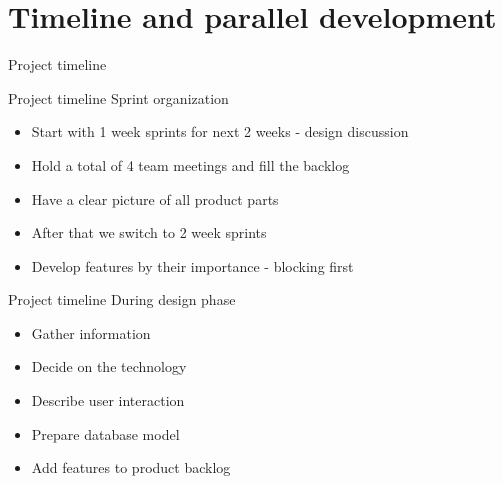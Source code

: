 \documentclass{beamer}
\begin{document}
	\section{Timeline and parallel development}
	
	\begin{frame}{Project timeline}
		\begin{figure}
		\end{figure}
	\end{frame}

	\begin{frame}{Project timeline}
		Sprint organization
		\begin{itemize}
			\item Start with 1 week sprints for next 2 weeks - design discussion
			\item Hold a total of 4 team meetings and fill the backlog
			\item Have a clear picture of all product parts
			\item After that we switch to 2 week sprints
			\item Develop features by their importance - blocking first
		\end{itemize}
	\end{frame}

	\begin{frame}{Project timeline}
		During design phase
		\begin{itemize}
			\item Gather information
			\item Decide on the technology
			\item Describe user interaction
			\item Prepare database model
			\item Add features to product backlog
		\end{itemize}
	\end{frame}
\end{document}
